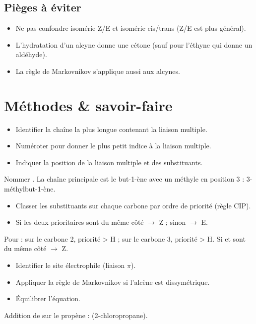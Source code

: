 \begin{synthese}
\subsection*{Pièges à éviter}
\begin{itemize}
    \item Ne pas confondre isomérie Z/E et isomérie cis/trans (Z/E est plus général).
    \item L'hydratation d'un alcyne donne une cétone (sauf pour l'éthyne qui donne un aldéhyde).
    \item La règle de Markovnikov s'applique aussi aux alcynes.
\end{itemize}
\end{synthese}

\section{Méthodes \& savoir-faire}

\begin{itemize}
    \item Identifier la chaîne la plus longue contenant la liaison multiple.
    \item Numéroter pour donner le plus petit indice à la liaison multiple.
    \item Indiquer la position de la liaison multiple et des substituants.
\end{itemize}
\begin{exemple}
Nommer .
La chaîne principale est le but-1-ène avec un méthyle en position 3 : 3-méthylbut-1-ène.
\end{exemple}

\begin{itemize}
    \item Classer les substituants sur chaque carbone par ordre de priorité (règle CIP).
    \item Si les deux prioritaires sont du même côté $\rightarrow$ Z ; sinon $\rightarrow$ E.
\end{itemize}
\begin{exemple}
Pour  : sur le carbone 2, priorité  > H ; sur le carbone 3, priorité  > H. Si  et  sont du même côté $\rightarrow$ Z.
\end{exemple}

\begin{itemize}
    \item Identifier le site électrophile (liaison $\pi$).
    \item Appliquer la règle de Markovnikov si l'alcène est dissymétrique.
    \item Équilibrer l'équation.
\end{itemize}
\begin{exemple}
Addition de  sur le propène :  (2-chloropropane).
\end{exemple}

